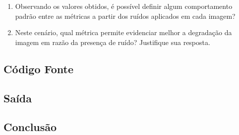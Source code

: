 \documentclass[10pt,a4paper]{article}
\begin{document}
\begin{enumerate}[label=\roman*.]
    \item Observando os valores obtidos, é possível definir algum comportamento padrão entre as métricas a partir dos ruídos aplicados em cada imagem?
    \item Neste cenário, qual métrica permite evidenciar melhor a degradação da imagem em razão da presença de ruído? Justifique sua resposta.
\end{enumerate}

\subsection{Código Fonte}



\subsection{Saída}



\subsection{Conclusão}
\end{document}
